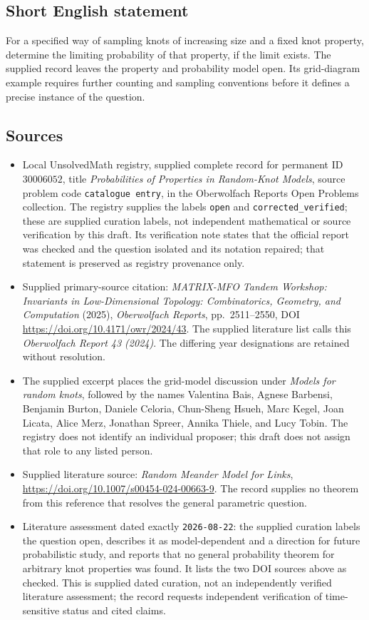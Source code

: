 \documentclass[11pt]{article}
\begin{document}
\subsection{Short English statement}
For a specified way of sampling knots of increasing size and a fixed knot property, determine the limiting probability of that property, if the limit exists. The supplied record leaves the property and probability model open. Its grid-diagram example requires further counting and sampling conventions before it defines a precise instance of the question.
\subsection{Sources}
\begin{itemize}
\item Local UnsolvedMath registry, supplied complete record for permanent ID \(30006052\), title \emph{Probabilities of Properties in Random-Knot Models}, source problem code \texttt{catalogue entry}, in the Oberwolfach Reports Open Problems collection. The registry supplies the labels \texttt{open} and \texttt{corrected\_verified}; these are supplied curation labels, not independent mathematical or source verification by this draft. Its verification note states that the official report was checked and the question isolated and its notation repaired; that statement is preserved as registry provenance only.
\item Supplied primary-source citation: \emph{MATRIX-MFO Tandem Workshop: Invariants in Low-Dimensional Topology: Combinatorics, Geometry, and Computation} (2025), \emph{Oberwolfach Reports}, pp.\ 2511--2550, DOI \url{https://doi.org/10.4171/owr/2024/43}. The supplied literature list calls this \emph{Oberwolfach Report 43 (2024)}. The differing year designations are retained without resolution.
\item The supplied excerpt places the grid-model discussion under \emph{Models for random knots}, followed by the names Valentina Bais, Agnese Barbensi, Benjamin Burton, Daniele Celoria, Chun-Sheng Hsueh, Marc Kegel, Joan Licata, Alice Merz, Jonathan Spreer, Annika Thiele, and Lucy Tobin. The registry does not identify an individual proposer; this draft does not assign that role to any listed person.
\item Supplied literature source: \emph{Random Meander Model for Links}, \url{https://doi.org/10.1007/s00454-024-00663-9}. The record supplies no theorem from this reference that resolves the general parametric question.
\item Literature assessment dated exactly \texttt{2026-08-22}: the supplied curation labels the question open, describes it as model-dependent and a direction for future probabilistic study, and reports that no general probability theorem for arbitrary knot properties was found. It lists the two DOI sources above as checked. This is supplied dated curation, not an independently verified literature assessment; the record requests independent verification of time-sensitive status and cited claims.

\end{itemize}
\end{document}
